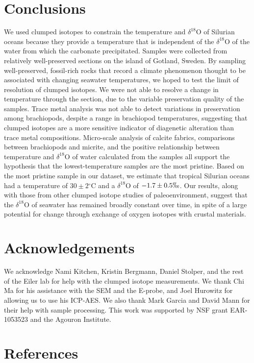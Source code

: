 \documentclass[5p, authoryear]{elsarticle}
\newcommand{\deltao}{$\delta^{18}$}
\newcommand{\degrees}{$^{\circ}$}
\begin{document}
\section{Conclusions}

We used clumped isotopes to constrain the temperature and \deltao O of Silurian oceans because they provide a temperature that is independent of the \deltao O of the water from which the carbonate precipitated. Samples were collected from relatively well-preserved sections on the island of Gotland, Sweden. By sampling well-preserved, fossil-rich rocks that record a climate phenomenon thought to be associated with changing seawater temperatures, we hoped to test the limit of resolution of clumped isotopes. We were not able to resolve a change in temperature through the section, due to the variable preservation quality of the samples. Trace metal analysis was not able to detect variations in preservation among brachiopods, despite a range in brachiopod temperatures, suggesting that clumped isotopes are a more sensitive indicator of diagenetic alteration than trace metal compositions. Micro-scale analysis of calcite fabrics, comparisons between brachiopods and micrite, and the positive relationship between temperature and \deltao O of water calculated from the samples all support the hypothesis that the lowest-temperature samples are the most pristine. Based on the most pristine sample in our dataset, we estimate that tropical Silurian oceans had a temperature of  $30\pm 2$\degrees C and a \deltao O of $-1.7\pm 0.5\permil$. Our results, along with those from other clumped isotope studies of paleoenvironment, suggest that the \deltao O of seawater has remained broadly constant over time, in spite of a large potential for change through exchange of oxygen isotopes with crustal materials. 

\section*{Acknowledgements}

We acknowledge Nami Kitchen, Kristin Bergmann, Daniel Stolper, and the rest of the Eiler lab for help with the clumped isotope measurements. We thank Chi Ma for his assistance with the SEM and the E-probe, and Joel Hurowitz for allowing us to use his ICP-AES. We also thank Mark Garcia and David Mann for their help with sample processing. This work was supported by NSF grant EAR-1053523 and the Agouron Institute. 

\nocite{*}

\section*{References}


\end{document}
